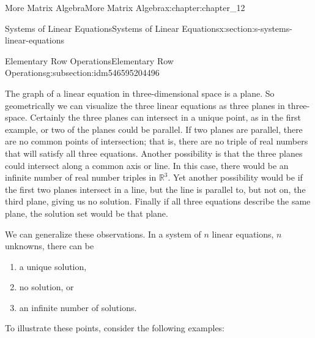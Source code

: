 \documentclass[oneside,10pt,]{book}
\numberwithin{equation}{section}
\begin{document}
\begin{chapterptx}{More Matrix Algebra}{}{More Matrix Algebra}{}{}{x:chapter:chapter_12}
\begin{sectionptx}{Systems of Linear Equations}{}{Systems of Linear Equations}{}{}{x:section:s-systems-linear-equations}
\begin{subsectionptx}{Elementary Row Operations}{}{Elementary Row Operations}{}{}{g:subsection:idm546595204496}
\par
The graph of a linear equation in three-dimensional space is a plane. So geometrically we can visualize the three linear equations as three planes in three-space. Certainly the three planes can intersect in a unique point, as in the first example, or two of the planes could be parallel. If two planes are parallel, there are no common points of intersection; that is, there are no triple of real numbers that will satisfy all three equations. Another possibility is that the three planes could intersect along a common axis or line. In this case, there would be an infinite number of real number triples in \(\mathbb{R}^3\). Yet another possibility would be if the first two planes intersect in a line, but the line is parallel to, but not on, the third plane, giving us no solution.  Finally if all three equations describe the same plane, the solution set would be that plane.%
\par
We can generalize these observations. In a system of \(n\) linear equations, \(n\) unknowns, there can be%
\begin{enumerate}[label=(\arabic*)]
\item{}a unique solution,%
\item{}no solution, or%
\item{}an infinite number of solutions.%
\end{enumerate}
%
\par
To illustrate these points, consider the following examples:%
\end{subsectionptx}
\end{sectionptx}
\end{chapterptx}
\end{document}
